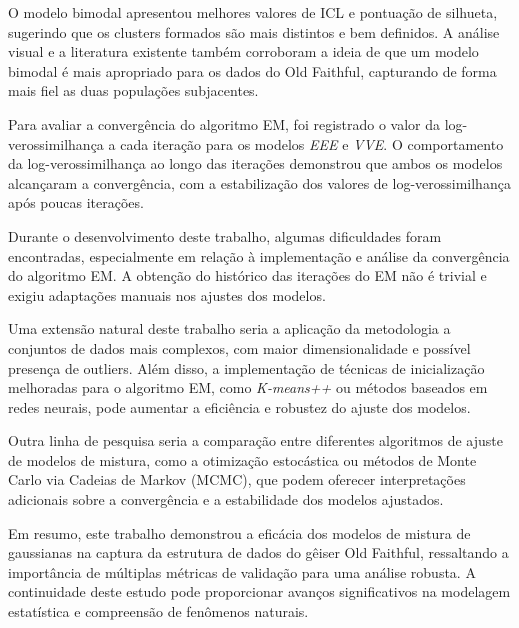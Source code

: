 \documentclass[12pt]{article}
\begin{document}
O modelo bimodal apresentou melhores valores de ICL e pontuação de silhueta, sugerindo que os clusters formados são mais distintos e bem definidos. A análise visual e a literatura existente também corroboram a ideia de que um modelo bimodal é mais apropriado para os dados do Old Faithful, capturando de forma mais fiel as duas populações subjacentes.

Para avaliar a convergência do algoritmo EM, foi registrado o valor da log-verossimilhança a cada iteração para os modelos \textit{EEE} e \textit{VVE}. O comportamento da log-verossimilhança ao longo das iterações demonstrou que ambos os modelos alcançaram a convergência, com a estabilização dos valores de log-verossimilhança após poucas iterações.

Durante o desenvolvimento deste trabalho, algumas dificuldades foram encontradas, especialmente em relação à implementação e análise da convergência do algoritmo EM. A obtenção do histórico das iterações do EM não é trivial e exigiu adaptações manuais nos ajustes dos modelos.

Uma extensão natural deste trabalho seria a aplicação da metodologia a conjuntos de dados mais complexos, com maior dimensionalidade e possível presença de outliers. Além disso, a implementação de técnicas de inicialização melhoradas para o algoritmo EM, como \textit{K-means++} ou métodos baseados em redes neurais, pode aumentar a eficiência e robustez do ajuste dos modelos.

Outra linha de pesquisa seria a comparação entre diferentes algoritmos de ajuste de modelos de mistura, como a otimização estocástica ou métodos de Monte Carlo via Cadeias de Markov (MCMC), que podem oferecer interpretações adicionais sobre a convergência e a estabilidade dos modelos ajustados.

Em resumo, este trabalho demonstrou a eficácia dos modelos de mistura de gaussianas na captura da estrutura de dados do gêiser Old Faithful, ressaltando a importância de múltiplas métricas de validação para uma análise robusta. A continuidade deste estudo pode proporcionar avanços significativos na modelagem estatística e compreensão de fenômenos naturais.


\newpage

 

\end{document}
